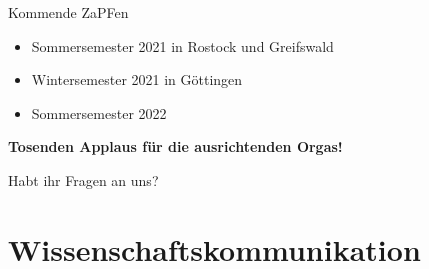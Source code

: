 \documentclass[compress, aspectratio=169]{beamer}
\begin{document}
\begin{frame}{Kommende ZaPFen}
  \begin{itemize}
    \item Sommersemester 2021 in Rostock und Greifswald
    \item Wintersemester 2021 in Göttingen
    \item Sommersemester 2022 \textit{\color{blue}{bei euch?}}    
\end{itemize}
    \vspace{1cm}
    \begin{center}
      \huge \textbf{Tosenden Applaus für die ausrichtenden Orgas!}
    \end{center}
\end{frame}

\begin{frame}[plain]
  \begin{center}
    \Huge Habt ihr Fragen an uns?
    \end{center}
\end{frame}


\section{Wissenschaftskommunikation}
\end{document}
